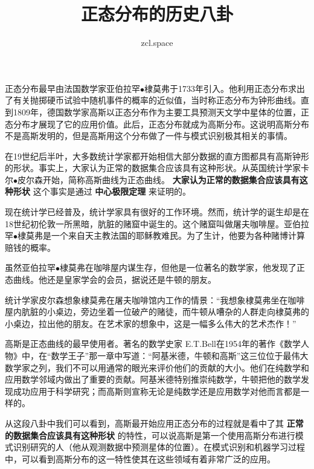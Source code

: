 \documentclass[10pt,a4paper,UTF8]{article}
\author{zcl.space}
\date{}
\title{正态分布的历史八卦}
\begin{document}
\maketitle
正态分布最早由法国数学家亚伯拉罕\(\bullet\)棣莫弗于1733年引入。他利用正态分布求出了有关抛掷硬币试验中随机事件的概率的近似值，当时称正态分布为钟形曲线。直到1809年，德国数学家高斯以正态分布作为主要工具预测天文学中星体的位置，正态分布才展现了它的应用价值。此后，正态分布就成为高斯分布。这说明高斯分布不是高斯发明的，但是高斯用这个分布做了一件与模式识别极其相关的事情。

在19世纪后半叶，大多数统计学家都开始相信大部分数据的直方图都具有高斯钟形的形状。事实上，大家认为正常的数据集合应该具有这种形状。从英国统计学家卡尔\(\bullet\)皮尔森开始，简称高斯曲线为正态曲线。 \textbf{大家认为正常的数据集合应该具有这种形状} 这个事实是通过 \textbf{中心极限定理} 来证明的。

现在统计学已经普及，统计学家具有很好的工作环境。然而，统计学的诞生却是在18世纪初伦敦一所黑暗，肮脏的赌窟中诞生的。这个赌窟叫做屠夫咖啡屋。亚伯拉罕\(\bullet\)棣莫弗是一个来自天主教法国的耶稣教难民。为了生计，他要为各种赌博计算赔钱的概率。

虽然亚伯拉罕\(\bullet\)棣莫弗在咖啡屋内谋生存，但他是一位著名的数学家，他发现了正态曲线。他还是皇家学会的会员，据说还是牛顿的朋友。

统计学家皮尔森想象棣莫弗在屠夫咖啡馆内工作的情景：“我想象棣莫弗坐在咖啡屋内肮脏的小桌边，旁边坐着一位破产的赌徒，而牛顿从嘈杂的人群走向棣莫弗的小桌边，拉出他的朋友。在艺术家的想象中，这是一幅多么伟大的艺术杰作！”

高斯是正态曲线的最早使用者。著名的数学史家 E.T.Bell在1954年的著作《数学人物》中，在“数学王子”那一章中写道：“阿基米德，牛顿和高斯”这三位位于最伟大数学家之列，我们不可以用通常的眼光来评价他们的贡献的大小。他们在纯数学和应用数学邻域内做出了重要的贡献。阿基米德特别推崇纯数学，牛顿把他的数学发现成功应用于科学研究；而高斯则宣称无论是纯数学还是应用数学对他而言都是一样的。

从这段八卦中我们可以看到，高斯最开始应用正态分布的过程就是看中了其 \textbf{正常的数据集合应该具有这种形状} 的特性，可以说高斯是第一个使用高斯分布进行模式识别研究的人（他从观测数据中预测星体的位置）。在模式识别和机器学习过程中，可以看到高斯分布的这一特性使其在这些领域有着非常广泛的应用。
\end{document}
